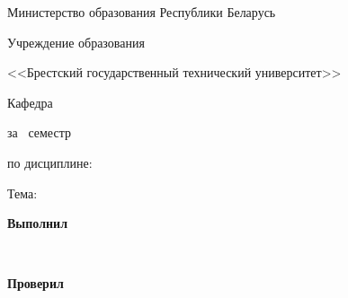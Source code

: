 \begin{center}
    Министерство образования Республики Беларусь

    Учреждение образования

    <<Брестский государственный технический университет>>

    Кафедра \titlePageKafedra
\end{center}

\vfill

\begin{center}
    \titlePageTypeWork

    за \titlePageSemestr~семестр

    по дисциплине: {\bfseries \titlePageLesson}

    Тема: \titlePageTopic
\end{center}

\vfill

\begin{flushright}
    \begin{minipage}[tl]{7cm}
        \textbf{Выполнил}

        \smallskip

        \titlePageStudentType

        \titlePageStudentSurname~\titlePageStudentName

        \bigskip

        \textbf{Проверил}

        \smallskip

        \titlePageTeacherSurname~\titlePageTeacherName
    \end{minipage}
\end{flushright}

\vfill

\begin{center}
    \titlePageCity~\the\year{}
\end{center}
